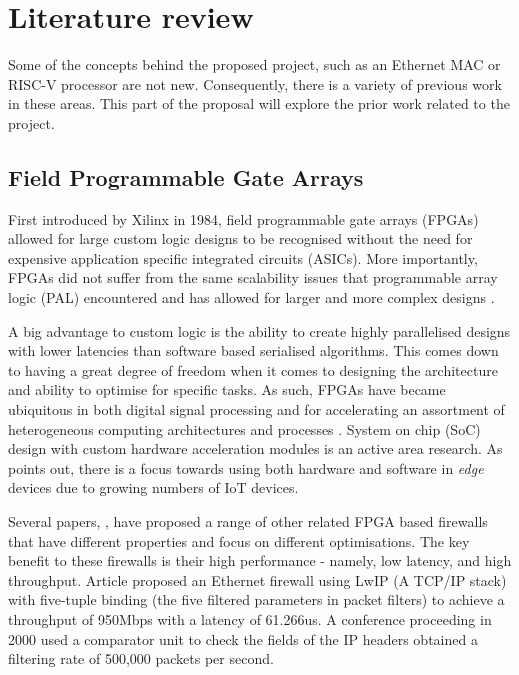 \chapter[Literature review]{Literature review }
\label{Chap:label}	%
\pagestyle{headings}



Some of the concepts behind the proposed project, such as an Ethernet MAC or RISC-V processor are not new. Consequently, there is a variety of previous work 
in these areas. This part of the proposal will explore the prior work related to the project. 


\section{Field Programmable Gate Arrays}
\label{subsection:fpga}	
First introduced by Xilinx in 1984, field programmable gate arrays (FPGAs) allowed for large custom logic designs to be recognised without the need for 
expensive application specific integrated circuits (ASICs). More importantly, FPGAs did not suffer from the same scalability issues that
programmable array logic (PAL) encountered and has allowed for larger and more complex designs \cite{30YearsOfFPGA}. 

A big advantage to custom logic is the ability to create highly parallelised designs with lower latencies than software based serialised algorithms. This comes down to 
having a great degree of freedom when it comes to designing the architecture and ability to optimise for specific tasks.
As such, FPGAs have became ubiquitous in both digital signal processing and for accelerating an assortment of heterogeneous computing architectures and processes \cite{FPGAComputing}.
System on chip (SoC) design with custom hardware acceleration modules is an active area research. As \cite{FPGAComputing} points out, there is a focus towards 
using both hardware and software in \textit{edge} devices due to growing numbers of IoT devices.


Several papers, \cite{LwIPFPGAFirewall} \cite{IPFPGAFirewall2000} \cite{packetFilteringFPGA}, have proposed a range of other related FPGA based firewalls that have 
different properties and focus on different optimisations. The key benefit to these firewalls is their high performance - namely, low latency, and high throughput. 
Article \cite{LwIPFPGAFirewall} proposed an Ethernet firewall using LwIP (A TCP/IP stack) with five-tuple binding (the five filtered parameters in packet filters) 
to achieve a throughput of 950Mbps with a latency of 61.266us. A conference proceeding in 2000 \cite{IPFPGAFirewall2000} used a comparator unit to check the 
fields of the IP headers obtained a filtering rate of 500,000 packets per second. 



